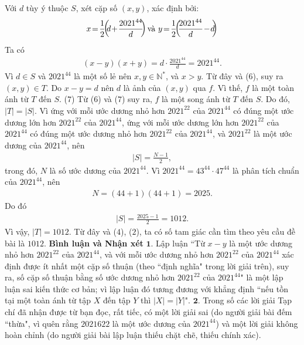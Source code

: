 \begin{multicols}{2}
	\vskip 0.05cm
	Với $d$ tùy ý thuộc $S$, xét cặp số $(x, y)$, xác định bởi:
	\begin{align*}
		x \!=\! \frac{1}{2}\!\!\left(\!\! {d \!+\! \frac{{{{2021}^{44}}}}{d}} \!\!\right) \text{\color{black} và } y \!=\! \frac{1}{2}\!\!\left(\!\! {\frac{{{{2021}^{44}}}}{d} \!-\! d}\!\! \right)
	\end{align*}
	Ta có
	\begin{align*}
		\left( {x \!-\! y} \right)\!\left( {x \!+\! y} \right) \!=\! d \!\cdot\! \frac{{{{2021}^{44}}}}{d} \!=\! {2021^{44}}. \tag{$6$}
	\end{align*}
	Vì $d \in S$ và $2021^{44}$  là một số lẻ nên $x, y \in \mathbb{N^*}$,  và $x > y$. Từ đây và ($6$), suy ra $(x, y) \in T$.
	\vskip 0.05cm
	Do $x - y = d$ nên $d$ là ảnh của $(x, y)$ qua  $f$. Vì thế,  $f$ là một toàn ánh từ $T$ đến $S$. \hfill ($7$)
	\vskip 0.05cm
	Từ ($6$) và ($7$) suy ra,  $f$ là một song ánh từ $T$ đến $S$. Do đó, $|T| = |S|$.
	\vskip 0.05cm 
	Vì ứng với mỗi ước dương nhỏ hơn $2021^{22}$  của $2021^{44}$  có đúng một ước dương lớn hơn $2021^{22}$  của  $2021^{44}$, ứng với mỗi ước dương lớn hơn $2021^{22}$   của  $2021^{44}$ có đúng một ước dương nhỏ hơn $2021^{22}$  của  $2021^{44}$, và $2021^{22}$  là một ước dương của  $2021^{44}$, nên
	\begin{align*}
		|S| = \frac{{N - 1}}{2},
	\end{align*}
	trong đó, $N$ là số ước dương của $2021^{44}$.
	\vskip 0.05cm
	Vì ${2021^{44}} = {43^{44}} \cdot {47^{44}}$ là phân tích chuẩn của $2021^{44}$, nên
	\begin{align*}
		N = \left( {44 + 1} \right)\left( {44 + 1} \right) = 2025.
	\end{align*}
	Do đó
	\begin{align*}
		|S| = \frac{{2025 - 1}}{2} = 1012.
	\end{align*}
	Vì vậy,  $|T| = 1012$. Từ đây và ($4$), ($2$), ta có số tam giác cần tìm theo yêu cầu đề bài là $1012$.
	\vskip 0.05cm
	\textbf{\color{thachthuctoanhoc}Bình luận và Nhận xét}
	\vskip 0.05cm
	$\pmb{1.}$ Lập luận ``Từ $x - y$ là một ước dương nhỏ hơn $2021^{22}$  của  $2021^{44}$, và với mỗi ước dương nhỏ hơn $2021^{22}$  của $2021^{44}$  xác định được ít nhất một cặp số thuận (theo ``định nghĩa" trong lời giải trên), suy ra, số cặp số thuận bằng số ước dương nhỏ hơn $2021^{22}$  của  $2021^{44}$" là một lập luận sai kiến thức cơ bản; vì lập luận đó tương đương với khẳng định ``nếu tồn tại một toàn ánh từ tập $X$ đến tập $Y$ thì  $|X| = |Y|$".
	\vskip 0.05cm
	$\pmb{2.}$ Trong số các lời giải Tạp chí đã nhận được từ bạn đọc, rất tiếc, có một lời giải sai (do người giải bài đếm ``thừa", vì quên rằng $20216{22}$  là một ước dương của  $2021^{44}$) và một lời giải không hoàn chỉnh (do người giải bài lập luận thiếu chặt chẽ, thiếu chính xác).

\end{multicols}
